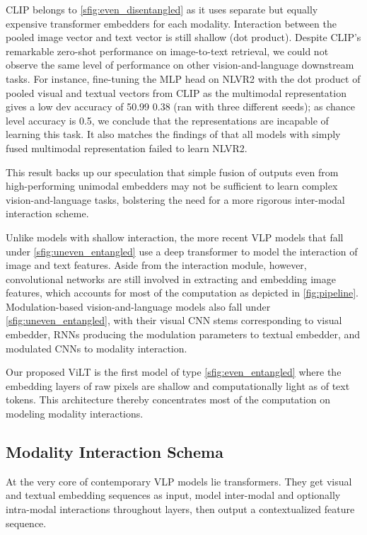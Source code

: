 \documentclass{article}
\begin{document}
CLIP \citep{radford2021learning} belongs to \cref{sfig:even_disentangled} as it uses separate but equally expensive transformer embedders for each modality.
Interaction between the pooled image vector and text vector is still shallow (dot product).
Despite CLIP's remarkable zero-shot performance on image-to-text retrieval, we could not observe the same level of performance on other vision-and-language downstream tasks.
For instance, fine-tuning the MLP head on NLVR2 \citep{suhr2018corpus} with the dot product of pooled visual and textual vectors from CLIP as the multimodal representation gives a low dev accuracy of 50.99  0.38
(ran with three different seeds);
as chance level accuracy is 0.5, we conclude that the representations are incapable of learning this task.
It also matches the findings of \citet{suhr2018corpus} that all models with simply fused multimodal representation failed to learn NLVR2.

This result backs up our speculation that simple fusion of outputs even from high-performing unimodal embedders may not be sufficient to learn complex vision-and-language tasks, bolstering the need for a more rigorous inter-modal interaction scheme.

Unlike models with shallow interaction, the more recent VLP models that fall under \cref{sfig:uneven_entangled} use a deep transformer to model the interaction of image and text features.
Aside from the interaction module, however, convolutional networks are still involved in extracting and embedding image features, which accounts for most of the computation as depicted in \cref{fig:pipeline}.
Modulation-based vision-and-language models \citep{perez2018film,nguyen2020revisiting} also fall under \cref{sfig:uneven_entangled}, with their visual CNN stems corresponding to visual embedder, RNNs producing the modulation parameters to textual embedder, and modulated CNNs to modality interaction.

Our proposed ViLT is the first model of type \cref{sfig:even_entangled} where the embedding layers of raw pixels are shallow and computationally light as of text tokens.
This architecture thereby concentrates most of the computation on modeling modality interactions.

\subsection{Modality Interaction Schema}

At the very core of contemporary VLP models lie transformers.
They get visual and textual embedding sequences as input, model inter-modal and optionally intra-modal interactions throughout layers, then output a contextualized feature sequence. 
\end{document}

